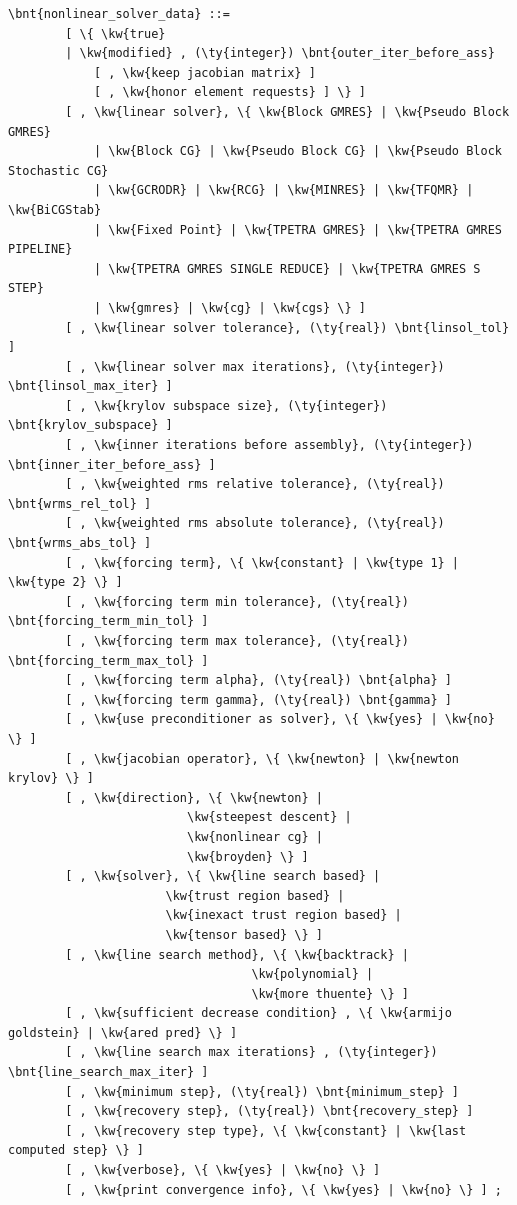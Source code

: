 \begin{Verbatim}[commandchars=\\\{\}]
    \bnt{nonlinear_solver_data} ::=
        [ \{ \kw{true}
        | \kw{modified} , (\ty{integer}) \bnt{outer_iter_before_ass}
            [ , \kw{keep jacobian matrix} ]
            [ , \kw{honor element requests} ] \} ]
        [ , \kw{linear solver}, \{ \kw{Block GMRES} | \kw{Pseudo Block GMRES}
            | \kw{Block CG} | \kw{Pseudo Block CG} | \kw{Pseudo Block Stochastic CG}
            | \kw{GCRODR} | \kw{RCG} | \kw{MINRES} | \kw{TFQMR} | \kw{BiCGStab}
            | \kw{Fixed Point} | \kw{TPETRA GMRES} | \kw{TPETRA GMRES PIPELINE}
            | \kw{TPETRA GMRES SINGLE REDUCE} | \kw{TPETRA GMRES S STEP}
            | \kw{gmres} | \kw{cg} | \kw{cgs} \} ]
        [ , \kw{linear solver tolerance}, (\ty{real}) \bnt{linsol_tol} ]
        [ , \kw{linear solver max iterations}, (\ty{integer}) \bnt{linsol_max_iter} ]
        [ , \kw{krylov subspace size}, (\ty{integer}) \bnt{krylov_subspace} ]
        [ , \kw{inner iterations before assembly}, (\ty{integer}) \bnt{inner_iter_before_ass} ]
        [ , \kw{weighted rms relative tolerance}, (\ty{real}) \bnt{wrms_rel_tol} ]
        [ , \kw{weighted rms absolute tolerance}, (\ty{real}) \bnt{wrms_abs_tol} ]
        [ , \kw{forcing term}, \{ \kw{constant} | \kw{type 1} | \kw{type 2} \} ]
        [ , \kw{forcing term min tolerance}, (\ty{real}) \bnt{forcing_term_min_tol} ]
        [ , \kw{forcing term max tolerance}, (\ty{real}) \bnt{forcing_term_max_tol} ]
        [ , \kw{forcing term alpha}, (\ty{real}) \bnt{alpha} ]
        [ , \kw{forcing term gamma}, (\ty{real}) \bnt{gamma} ]
        [ , \kw{use preconditioner as solver}, \{ \kw{yes} | \kw{no} \} ]
        [ , \kw{jacobian operator}, \{ \kw{newton} | \kw{newton krylov} \} ]
        [ , \kw{direction}, \{ \kw{newton} |
                         \kw{steepest descent} |
                         \kw{nonlinear cg} |
                         \kw{broyden} \} ]
        [ , \kw{solver}, \{ \kw{line search based} |
                      \kw{trust region based} |
                      \kw{inexact trust region based} |
                      \kw{tensor based} \} ]
        [ , \kw{line search method}, \{ \kw{backtrack} |
                                  \kw{polynomial} |
                                  \kw{more thuente} \} ]
        [ , \kw{sufficient decrease condition} , \{ \kw{armijo goldstein} | \kw{ared pred} \} ]
        [ , \kw{line search max iterations} , (\ty{integer}) \bnt{line_search_max_iter} ]
        [ , \kw{minimum step}, (\ty{real}) \bnt{minimum_step} ]
        [ , \kw{recovery step}, (\ty{real}) \bnt{recovery_step} ]
        [ , \kw{recovery step type}, \{ \kw{constant} | \kw{last computed step} \} ]
        [ , \kw{verbose}, \{ \kw{yes} | \kw{no} \} ]
        [ , \kw{print convergence info}, \{ \kw{yes} | \kw{no} \} ] ;
\end{Verbatim}
